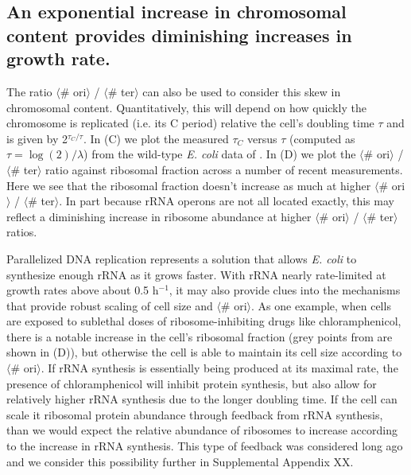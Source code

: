 \subsection{An exponential increase in chromosomal content provides diminishing
increases in growth rate.}

The ratio $\langle$\# ori$\rangle$ / $\langle$\# ter$\rangle$ can also be used
to consider this skew in chromosomal content. Quantitatively, this will depend on how
 quickly the chromosome is replicated (i.e. its C period) relative the cell's doubling time $\tau$
and is given by 2$^{\tau_C / \tau}$. In (C) we plot
the measured $\tau_C$ versus $\tau$ (computed as $\tau = \log (2) / \lambda$)
from the wild-type \textit{E. coli} data of \citep{si2017}. In (D) we
plot the $\langle$\# ori$\rangle$ / $\langle$\# ter$\rangle$ ratio against
ribosomal fraction across a number of recent measurements.
Here we see that the ribosomal fraction doesn't increase as much at higher
$\langle$\# ori$\rangle$ / $\langle$\# ter$\rangle$. In part because rRNA
operons are not all located exactly,  this may reflect a diminishing increase in
ribosome abundance at higher $\langle$\# ori$\rangle$ / $\langle$\# ter$\rangle$
ratios.

Parallelized DNA replication represents a solution that allows  \textit{E. coli}
to synthesize enough rRNA as it grows faster. With rRNA nearly rate-limited at
growth rates above about 0.5 h$^{-1}$, it may also provide clues  into the
mechanisms that provide robust scaling  of cell size and $\langle$\#
ori$\rangle$. As one example, when cells are exposed to sublethal doses of
ribosome-inhibiting drugs like chloramphenicol, there is a notable increase in
the cell's ribosomal fraction (grey points from \cite{si2017} are shown in
(D)), but otherwise the cell is able to maintain
its cell size according to $\langle$\# ori$\rangle$. If rRNA synthesis is
essentially being produced at its maximal rate, the presence of chloramphenicol
will inhibit protein synthesis, but also allow for relatively higher rRNA
synthesis due to the longer doubling time. If the cell can scale it ribosomal
protein abundance through feedback from rRNA synthesis, than we would expect the
relative abundance of ribosomes to increase according to the increase in rRNA
synthesis. This type of feedback was considered long ago \citep{nomura1984} and
we consider this possibility further in Supplemental Appendix XX.


